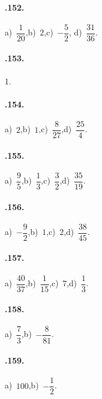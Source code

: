 \begin{multicols}{2}
\paragraph{\thechapter.152.}
a)~$\dfrac{1}{20}$,\quad b)~$2$,\quad c)~$-\dfrac{5}{2}$,\quad %
d)~$\dfrac{31}{36}$.

\paragraph{\thechapter.153.}1.

\paragraph{\thechapter.154.}
a)~$2$,\quad b)~$1$,\quad c)~$\dfrac{8}{27}$,\quad d)~$\dfrac{25}{4}$.

\paragraph{\thechapter.155.}
a)~$\dfrac{9}{5}$,\quad b)~$\dfrac{1}{3}$,\quad c)~$\dfrac{3}{2}$,\quad d)~$\dfrac{35}{19}$.

\paragraph{\thechapter.156.}
a)~$-\dfrac{9}{2}$,\quad b)~$1$,\quad c)~$2$,\quad d)~$\dfrac{38}{45}$.

\paragraph{\thechapter.157.}
a)~$\dfrac{40}{37}$,\quad b)~$\dfrac{1}{15}$,\quad c)~$7$,\quad d)~$\dfrac{1}{3}$.

\paragraph{\thechapter.158.}
a)~$\dfrac{7}{3}$,\quad b)~$-\dfrac{8}{81}$.

\paragraph{\thechapter.159.}
a)~$100$,\quad b)~$-\dfrac{1}{2}$.
\end{multicols}

